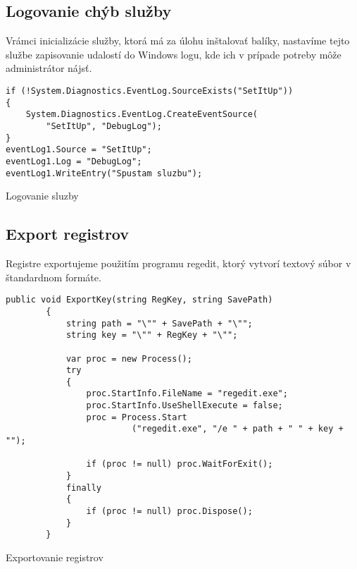 \subsection{Logovanie chýb služby}
Vrámci inicializácie služby, ktorá má za úlohu inštalovať balíky, nastavíme tejto službe zapisovanie udalostí do Windows logu, kde ich v prípade potreby môže administrátor nájsť.
\begin{listing}
\begin{verbatim}
if (!System.Diagnostics.EventLog.SourceExists("SetItUp"))
{
    System.Diagnostics.EventLog.CreateEventSource(
        "SetItUp", "DebugLog");
}
eventLog1.Source = "SetItUp";
eventLog1.Log = "DebugLog";
eventLog1.WriteEntry("Spustam sluzbu");
\end{verbatim}
\caption{Logovanie sluzby}
\label{lst:initlog}
\end{listing}

\subsection{Export registrov}
Registre exportujeme použitím programu regedit, ktorý vytvorí textový súbor v štandardnom formáte.
\begin{listing}
\begin{verbatim}
public void ExportKey(string RegKey, string SavePath)
        {
            string path = "\"" + SavePath + "\"";
            string key = "\"" + RegKey + "\"";

            var proc = new Process();
            try
            {
                proc.StartInfo.FileName = "regedit.exe";
                proc.StartInfo.UseShellExecute = false;
                proc = Process.Start
                         ("regedit.exe", "/e " + path + " " + key + "");

                if (proc != null) proc.WaitForExit();
            }
            finally
            {
                if (proc != null) proc.Dispose();
            }
        }  
\end{verbatim}
\caption{Exportovanie registrov}
\label{lst:regexport}
\end{listing}

